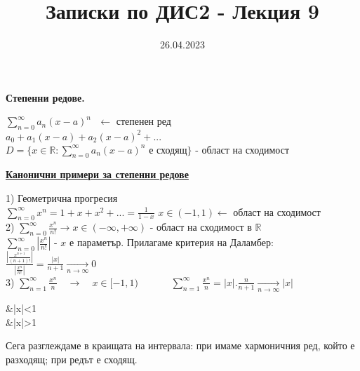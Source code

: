 \documentclass[12pt]{article}
\newcommand{\spc}{\text{ }}
\begin{document}
	\color{white}
	\pagecolor{darkgray}
	\title{Записки по ДИС2 - Лекция 9}
	\date{26.04.2023}
	\maketitle
	\begin{center}
		\Large
		\textbf{Степенни редове.}
	\end{center}
	
	$\sum_{n=0}^{\infty}a_n(x-a)^n\spc \leftarrow$ степенен ред\\
	$a_0 + a_1(x-a) + a_2(x-a)^2 + ...$\\
	$D = \Biggl\{x\in \mathbb{R} : \sum_{n=0}^{\infty}a_n(x-a)^n \text{ е сходящ}\Biggr\}$ - област на сходимост\\
	
	\begin{center}
		\textbf{\large\underline{Канонични примери за степенни редове}}
	\end{center}
	1) Геометрична прогресия\\
	$\sum_{n=0}^{\infty}x^n = 1 + x + x^2 + ... = \frac{1}{1-x}$
	$x\in (-1, 1) \leftarrow$ област на сходимост\\
	$\spc$\\
	$\spc$\\
	2) $\sum_{n=0}^{\infty}\frac{x^n}{n!} \rightarrow x\in(-\infty, +\infty)$ - област на сходимост в $\mathbb{R}$\\
	$\sum_{n=0}^{\infty}\left|\frac{x^n}{n!}\right|$ - $x$ е параметър. Прилагаме критерия на Даламбер:
	$\frac{\left|\frac{x^{n+1}}{(n+1)!}\right|}{\left|\frac{x^n}{n!}\right|} = \frac{|x|}{n+1}\underset{n\to\infty}{\longrightarrow}0$\\
	$\spc$\\
	$\spc$\\
	3) $\sum_{n=1}^{\infty}\frac{x^n}{n}\quad\longrightarrow\quad x\in[-1,1)$
	$\quad\quad\quad\sum_{n=1}^{\infty}\frac{x^n}{n} = |x|.\frac{n}{n+1}\underset{n\to\infty}{\longrightarrow}|x|$\\
	\begin{flalign*} &|x|<1\\
	&|x|>1
	\end{flalign*}
	Сега разглеждаме в краищата на интервала: при  имаме хармоничния ред, който е разходящ; при  редът е сходящ.\\
	
\end{document}
